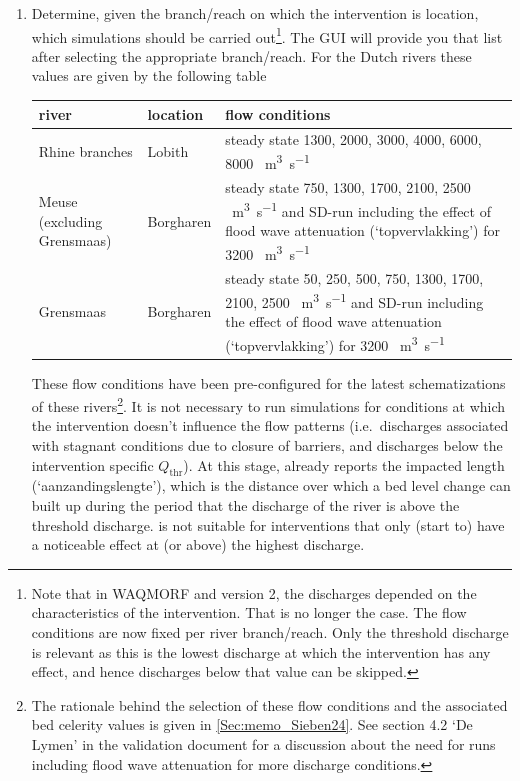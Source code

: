 \begin{enumerate}
\item Determine, given the branch/reach on which the intervention is location, which \dflowfm simulations should be carried out\footnote{Note that in WAQMORF and \dfmi version 2, the discharges depended on the characteristics of the intervention.
That is no longer the case.
The flow conditions are now fixed per river branch/reach.
Only the threshold discharge is relevant as this is the lowest discharge at which the intervention has any effect, and hence discharges below that value can be skipped.}.
The \dfmi GUI will provide you that list after selecting the appropriate branch/reach.
For the Dutch rivers these values are given by the following table
\newline
\newline
\begin{tabular}{p{2.5cm}|l|p{8.5cm}}
river & location & flow conditions \\ \hline
Rhine branches & Lobith & steady state 1300, 2000, 3000, 4000, 6000, 8000 \SI{}{\metre\cubed\per\second}\\
Meuse (excluding Grensmaas) & Borgharen & steady state 750, 1300, 1700, 2100, 2500 \SI{}{\metre\cubed\per\second} and SD-run including the effect of flood wave attenuation (`topvervlakking') for 3200 \SI{}{\metre\cubed\per\second} \\
Grensmaas & Borgharen & steady state 50, 250, 500, 750, 1300, 1700, 2100, 2500 \SI{}{\metre\cubed\per\second} and SD-run including the effect of flood wave attenuation (`topvervlakking') for 3200 \SI{}{\metre\cubed\per\second}
\end{tabular}
\newline
\newline
These flow conditions have been pre-configured for the latest \dflowfm schematizations of these rivers\footnote{The rationale behind the selection of these flow conditions and the associated bed celerity values is given in \autoref{Sec:memo_Sieben24}.
See section 4.2 `De Lymen' in the \dfmi validation document for a discussion about the need for runs including flood wave attenuation for more discharge conditions.}.
It is not necessary to run simulations for conditions at which the intervention doesn't influence the flow patterns (i.e.~discharges associated with stagnant conditions due to closure of barriers, and discharges below the intervention specific $Q_\text{thr}$).
At this stage, \dfmi already reports the impacted length (`aanzandingslengte'), which is the distance over which a bed level change can built up during the period that the discharge of the river is above the threshold discharge.
\dfmi is not suitable for interventions that only (start to) have a noticeable effect at (or above) the highest discharge.


\end{enumerate}
